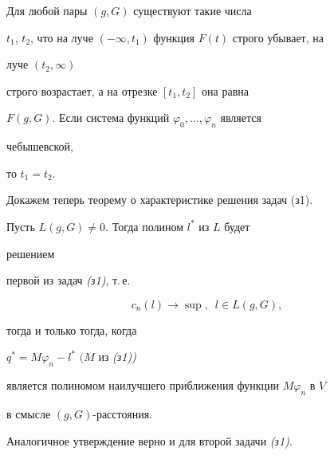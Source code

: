  


\begin{cornonum} Для любой пары $(g,G)$ существуют такие числа 


$t_1$, $t_2$, что на луче $(-\infty,t_1)$ функция $F(t)$ строго убывает, на 


луче $(t_2,\infty)$ 


строго возрастает, а на отрезке $[t_1,t_2]$ она равна 


$F(g,G)$. Если система функций $\varphi_0,\dotsc,\varphi_n$ является 


чебышевской, 


то $t_1=t_2$. 


\end{cornonum} 


 


Докажем теперь теорему о характеристике решения задач (з1). 


 


\begin{thm} Пусть $L(g,G)\ne 0$. Тогда полином $l^*$ из $L$ будет 


решением 


первой из задач {\em (з1)}, т.\,е. 


\begin{equation} 


c_n(l)\to\sup,\ \;l\in L(g,G),\tag{$*$} 


\end{equation} 


тогда и только тогда, когда 


$q^*=M\varphi_n-l^*$ $(M$ из {\em (з1))} 


является полиномом наилучшего приближения функции $M\varphi_n$ в $V$ 


в смысле $(g,G)$-расстояния. 


 


Аналогичное утверждение верно и для второй задачи {\em (з1)}. 


\end{thm} 


 


